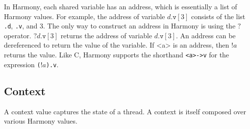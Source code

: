 \documentclass{report}
\begin{document}
{In Harmony, each shared variable has an address, which is essentially
a list of Harmony values.
For example, the address of variable $d.\mathtt{v}[3]$ consists of the
list \texttt{.d}, \texttt{.v}, and 3.  The only way to construct an
address in Harmony is using the $?$ operator.
$?d.\mathtt{v}[3]$ returns the address of variable $d.\mathtt{v}[3]$.
An address can be dereferenced to return the value of the variable.
If <{a}> is an address, then $!a$ returns the value.
Like C, Harmony supports the shorthand \texttt{<{a}>->v} for 
the expression \texttt{($!a$).v}.

\subsection*{Context}

A context value captures the state of a thread.
A context is itself composed over various Harmony values.

}
\end{document}
